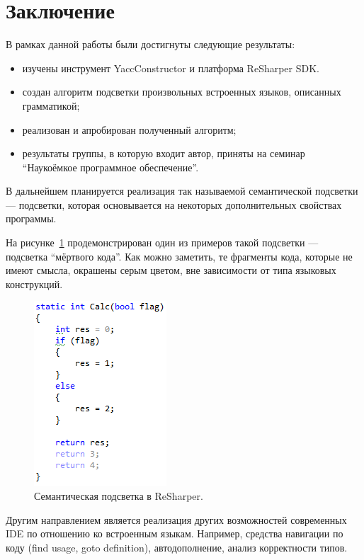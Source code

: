 \section*{Заключение}

В рамках данной работы были достигнуты следующие результаты:
\begin{itemize}
\item изучены инструмент YaccConstructor и платформа ReSharper SDK.
\item создан алгоритм подсветки произвольных встроенных языков, описанных грамматикой;
\item реализован и апробирован полученный алгоритм;
\item результаты группы, в которую входит автор, приняты на семинар ``Наукоёмкое программное обеспечение''.
\end{itemize}

В дальнейшем планируется реализация так называемой семантической подсветки --- подсветки, которая основывается на некоторых дополнительных свойствах программы. 

На рисунке~\ref{dead_code} продемонстрирован один из примеров такой подсветки --- подсветка ``мёртвого кода''. Как можно заметить, те фрагменты кода, которые не имеют смысла, окрашены серым цветом, вне зависимости от типа языковых конструкций.

\begin{figure}[t]
\centering
\includegraphics{Ivanov/Pictures/dead_code.PNG}
\caption{Семантическая подсветка в ReSharper.}
\label{dead_code}
\end{figure}

Другим направлением является реализация других возможностей современных IDE по отношению ко встроенным языкам. Например, средства навигации по коду (find usage, goto definition), автодополнение, анализ корректности типов. 

